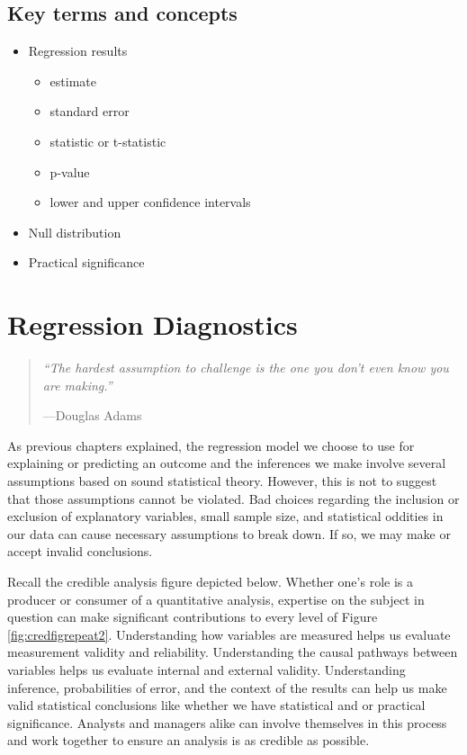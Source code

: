 \documentclass[
]{book}
\providecommand{\tightlist}{%
  \setlength{\itemsep}{0pt}\setlength{\parskip}{0pt}}
\newenvironment{learncheck}%
{%
  \par\vspace{\baselineskip}\noindent 
  \color{Exercise}\begin{itshape}%
  \par\vspace{\baselineskip}\noindent\ignorespaces 
}%
{%
  \end{itshape}\ignorespacesafterend 
}
\begin{document}
\hypertarget{kt12}{%
\section{Key terms and concepts}\label{kt12}}

\begin{learncheck}
\begin{itemize}
\tightlist
\item
  Regression results

  \begin{itemize}
  \tightlist
  \item
    estimate
  \item
    standard error
  \item
    statistic or t-statistic
  \item
    p-value
  \item
    lower and upper confidence intervals
  \end{itemize}
\item
  Null distribution
\item
  Practical significance
\end{itemize}
\end{learncheck}

\hypertarget{regression-diagnostics}{%
\chapter{Regression Diagnostics}\label{regression-diagnostics}}

\begin{quote}
\emph{``The hardest assumption to challenge is the one you don't even know you are making.''}

---Douglas Adams
\end{quote}

As previous chapters explained, the regression model we choose to use for explaining or predicting an outcome and the inferences we make involve several assumptions based on sound statistical theory. However, this is not to suggest that those assumptions cannot be violated. Bad choices regarding the inclusion or exclusion of explanatory variables, small sample size, and statistical oddities in our data can cause necessary assumptions to break down. If so, we may make or accept invalid conclusions.

Recall the credible analysis figure depicted below. Whether one's role is a producer or consumer of a quantitative analysis, expertise on the subject in question can make significant contributions to every level of Figure \ref{fig:credfigrepeat2}. Understanding how variables are measured helps us evaluate measurement validity and reliability. Understanding the causal pathways between variables helps us evaluate internal and external validity. Understanding inference, probabilities of error, and the context of the results can help us make valid statistical conclusions like whether we have statistical and or practical significance. Analysts and managers alike can involve themselves in this process and work together to ensure an analysis is as credible as possible.
\end{document}

